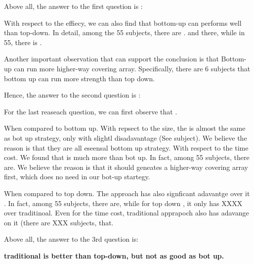 \documentclass[conference]{IEEEtran}
\theoremstyle{definition}
\begin{document}
Above all, the answer to the first question is :




With respect to the effiecy, we can also find that bottom-up can performs well than top-down. In detail, among the 55 subjects, there are . and there, while in 55, there is .

Another important observation that can support the conclusion is that Bottom-up can run more higher-way covering array. Specifically, there are 6 subjects that bottom up can run more strength than top down.

Hence, the answer to the second question is :


For the last reaseach question, we can first observe that .

When compared to bottom up. With repsect to the size, the is almost the same as bot up strategy, only with slightl disadavantage (See subject). We believe the reason is that they are all eseensal bottom up strategy.  With respect to the time cost. We found that is much more than bot up. In fact, among 55 subjects, there are.  We believe the reason is that it should geneates a higher-way covering array first, which does no need in our bot-up startegy.

When compared to top down. The approach has also signficant adavantge over it . In fact, among 55 subjects, there are,  while for top down , it only has XXXX  over traditinoal. Even for the time cost, traditional apprapoch also has adavange on it (there are XXX subjects, that.

Above all, the answer to the 3rd question is:

\textbf{traditional is better than top-down, but not as good as bot up.}



\end{document}
